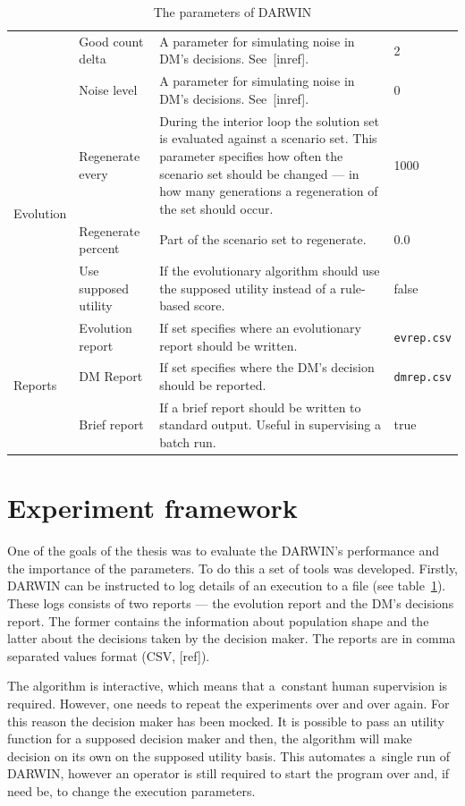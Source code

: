 \begin{table}
\begin{tabular}{l l p{7cm} l}
    & Good count delta & A parameter for simulating noise in DM's decisions. See~[inref]. & 2 \\
    & Noise level & A parameter for simulating noise in DM's decisions. See~[inref]. & 0 \\
    \hline
    \multirow{3}{*}{Evolution} & Regenerate every & During the interior loop
    the solution set is evaluated against a scenario set. This parameter
    specifies how often the scenario set should be changed --- in how many
    generations a regeneration of the set should occur. & 1000 \\
    & Regenerate percent & Part of the scenario set to regenerate. & 0.0 \\
    & Use supposed utility & If the evolutionary algorithm should use the
    supposed utility instead of a rule-based score. & false \\
  \hline
  \multirow{3}{*}{Reports} & Evolution report & If set specifies where an
  evolutionary report should be written.  & \texttt{evrep.csv} \\
  & DM Report & If set specifies where the DM's decision should be reported. & \texttt{dmrep.csv} \\
  &  Brief report & If a brief report should be written to standard
  output. Useful in supervising a batch run. & true \\
  \hline
  \end{tabular}
  \caption{The parameters of DARWIN}
  \label{t:params}
\end{table}


\section{Experiment framework}
One of the goals of the thesis was to evaluate the DARWIN's performance and
the importance of the parameters. To do this a set of tools was
developed. Firstly, DARWIN can be instructed to log details of an execution to
a file (see table~\ref{t:params}). These logs consists of two reports --- the
evolution report and the DM's decisions report. The former contains the
information about population shape and the latter about the decisions taken by
the decision maker. The reports are in comma separated values format (CSV,
[ref]).

The algorithm is interactive, which means that a~constant human supervision is
required. However, one needs to repeat the experiments over and over
again. For this reason the decision maker has been mocked. It is possible to
pass an utility function for a supposed decision maker and then, the algorithm
will make decision on its own on the supposed utility basis. This automates
a~single run of DARWIN, however an operator is still required to start the
program over and, if need be, to change the execution parameters.

